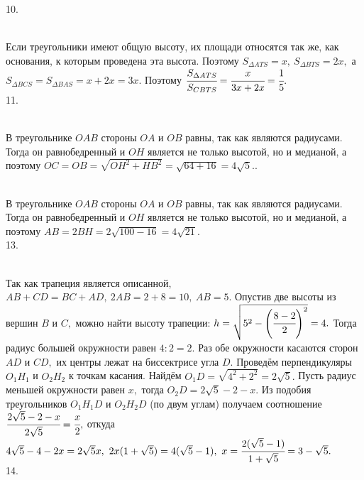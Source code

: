 10. \begin{figure}[ht!]
\end{figure}\\
Если треугольники имеют общую высоту, их площади относятся так же, как основания, к которым проведена эта высота. Поэтому $S_{\Delta ATS}=x,\ S_{\Delta BTS}=2x,$ а $S_{\Delta BCS}=S_{\Delta BAS}=x+2x=3x.$ Поэтому $\cfrac{S_{\Delta ATS}}{S_{CBTS}}=\cfrac{x}{3x+2x}=\cfrac{1}{5}.$\\
11. \begin{figure}[ht!]
\end{figure}\\
В треугольнике $OAB$ стороны $OA$ и $OB$ равны, так как являются радиусами. Тогда он равнобедренный и $OH$ является не только высотой, но и медианой, а поэтому $OC=OB=\sqrt{OH^2+HB^2}=\sqrt{64+16}=4\sqrt{5}.$\newpage{}. \begin{figure}[ht!]
\end{figure}\\
В треугольнике $OAB$ стороны $OA$ и $OB$ равны, так как являются радиусами. Тогда он равнобедренный и $OH$ является не только высотой, но и медианой, а поэтому $AB=2BH=2\sqrt{100-16}=4\sqrt{21}.$\\
13. \begin{figure}[ht!]
\end{figure}\\
Так как трапеция является описанной, $AB+CD=BC+AD,\ 2AB=2+8=10,\ AB=5.$ Опустив две высоты из вершин $B$ и $C,$ можно найти высоту трапеции: $h=\sqrt{5^2-\left(\cfrac{8-2}{2}\right)^2}=4.$ Тогда радиус большей окружности равен $4:2=2.$ Раз обе окружности касаются сторон $AD$ и $CD,$ их центры лежат на биссектрисе угла $D.$ Проведём перпендикуляры $O_1H_1$ и $O_2H_2$ к точкам касания. Найдём $O_1D=\sqrt{4^2+2^2}=2\sqrt{5}.$ Пусть радиус меньшей окружности равен $x,$ тогда  $O_2D=2\sqrt{5}-2-x.$ Из подобия треугольников $O_1H_1D$ и $O_2H_2D$ (по двум углам) получаем соотношение $\cfrac{2\sqrt{5}-2-x }{2\sqrt{5}}=\cfrac{x}{2},$ откуда $4\sqrt{5}-4-2x=2\sqrt{5}x,\ 2x(1+\sqrt{5})=4(\sqrt{5}-1),\ x=\cfrac{2(\sqrt{5}-1)}{1+\sqrt{5}}=3-\sqrt{5}.$\\
14. \begin{figure}[ht!]
\end{figure}\\

